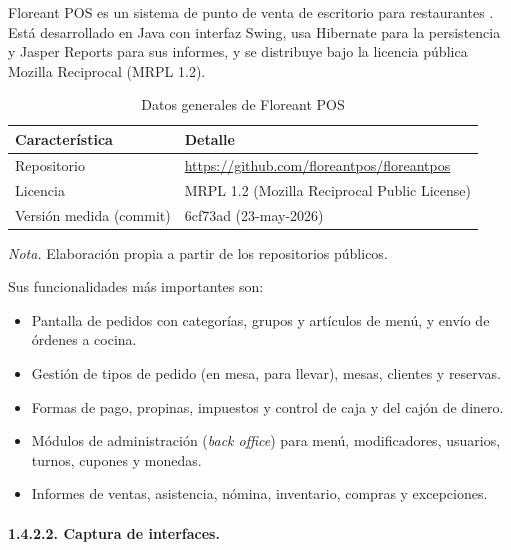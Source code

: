 Floreant POS es un sistema de punto de venta de escritorio para restaurantes \parencite{floreantpos2026}. Está desarrollado en Java con interfaz Swing, usa Hibernate para la persistencia y Jasper Reports para sus informes, y se distribuye bajo la licencia pública Mozilla Reciprocal (MRPL 1.2).

\begin{table}[H]
\caption{Datos generales de Floreant POS}
\label{tab:ref2_datos}
\begin{threeparttable}
\begin{tabular}{>{\raggedright\arraybackslash}p{6.2cm} >{\raggedright\arraybackslash}p{6.8cm}}
\toprule
Característica & Detalle \\
\midrule
Repositorio & \url{https://github.com/floreantpos/floreantpos} \\
Licencia & MRPL 1.2 (Mozilla Reciprocal Public License) \\
Versión medida (commit) & 6cf73ad (23-may-2026) \\
\bottomrule
\end{tabular}
\begin{tablenotes}
\item \textit{Nota.} Elaboración propia a partir de los repositorios públicos.
\end{tablenotes}
\end{threeparttable}
\end{table}

Sus funcionalidades más importantes son:

\begin{itemize}
    \item Pantalla de pedidos con categorías, grupos y artículos de menú, y envío de órdenes a cocina.
    \item Gestión de tipos de pedido (en mesa, para llevar), mesas, clientes y reservas.
    \item Formas de pago, propinas, impuestos y control de caja y del cajón de dinero.
    \item Módulos de administración (\textit{back office}) para menú, modificadores, usuarios, turnos, cupones y monedas.
    \item Informes de ventas, asistencia, nómina, inventario, compras y excepciones.
\end{itemize}

\paragraph{1.4.2.2. Captura de interfaces.}

